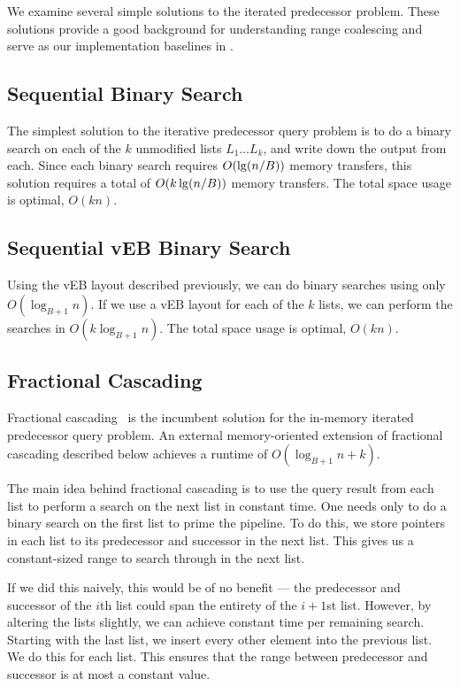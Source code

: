 We examine several simple solutions to the iterated predecessor problem. 
These solutions provide a good background for understanding range coalescing and
serve as our implementation baselines in .

\subsection*{Sequential Binary Search}
The simplest solution to the iterative predecessor query problem 
is to do a binary search on each of the $k$ unmodified lists 
$L_1 \ldots L_k$, and write 
down the output from each. Since each binary search requires $O(\lg \mathopen{}\left(n/B\right)\mathclose{})$ memory transfers, 
this solution requires a total of $O(k \lg \mathopen{}\left(n/B\right)\mathclose{})$ memory transfers. The total space 
usage is optimal, $O(kn)$.

\subsection*{Sequential vEB Binary Search}
Using the vEB layout described previously, we can do binary searches using only 
$O(\log_{B+1} n)$. If we use a vEB layout for each of the $k$ lists, we can perform 
the searches in $O(k \log_{B+1} n)$. The total space usage is optimal, $O(kn)$.

\subsection*{Fractional Cascading}
Fractional cascading~\cite{ChazelleGu86a} is the incumbent solution for the in-memory iterated 
predecessor query problem. An external memory-oriented extension of fractional cascading
described below achieves a runtime of $O(\log_{B+1} n + k)$.

The main idea behind fractional cascading is to use the query result from 
each list to perform a search on the next list in 
constant time.  One needs only to do a binary search on the first list to prime the
pipeline.  To do this, we store pointers in each list to its predecessor and 
successor in the next list. This gives us a constant-sized range to 
search through in the next list.

If we did this naively, this would be of no benefit --- the predecessor and 
successor of the $i$th list could span the entirety of the $i+1$st list. 
However, by altering the lists slightly, 
we can achieve constant time per remaining search. Starting with the last list, 
we insert every other element into the previous list. We do this for each list. 
This ensures that the range between predecessor and successor is at most a constant value.

